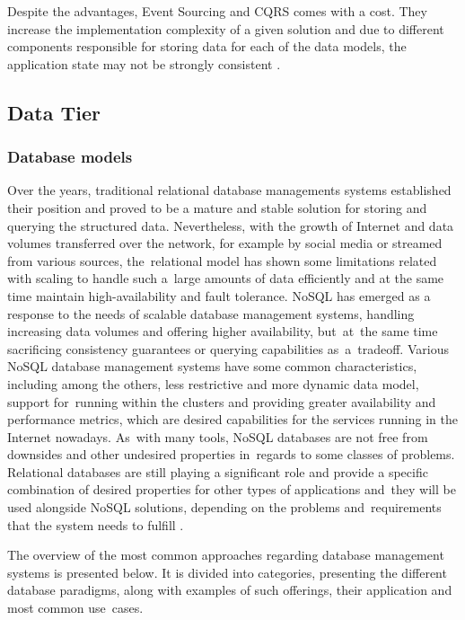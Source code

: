 Despite the advantages, Event Sourcing and CQRS comes with a cost. They increase the implementation complexity of a given solution and due to different components responsible for storing data for each of the data models, the application state may not be strongly consistent \cite{MicroservicesArchitecture}.

\subsection{Data Tier}

\subsubsection{Database models} \label{chapter:database-paradigms}

Over the years, traditional relational database managements systems \cite{RDBMS} established their position and proved to be a mature and stable solution for storing and querying the structured data. Nevertheless, with the growth of Internet and data volumes transferred over the network, for example by social media or streamed from various sources, the~relational model has shown some limitations related with scaling to handle such a~large amounts of data efficiently and at the same time maintain high-availability and fault tolerance. NoSQL \cite{FowlerNoSQLDefinition} has emerged as a response to the needs of scalable database management systems, handling increasing data volumes and offering higher availability, but~at~the same time sacrificing consistency guarantees or querying capabilities as~a~tradeoff. Various NoSQL database management systems have some common characteristics, including among the others, less restrictive and more dynamic data model, support for~running within the clusters and providing greater availability and performance metrics, which are desired capabilities for the services running in the Internet nowadays. As~with many tools, NoSQL databases are not free from downsides and other undesired properties in~regards to some classes of problems. Relational databases are still playing a significant role and provide a specific combination of desired properties for other types of applications and~they will be used alongside NoSQL solutions, depending on the problems and~requirements that the system needs to fulfill \cite{FowlerNoSQLGOTO}.

The overview of the most common approaches regarding database management systems is presented below. It is divided into categories, presenting the different database paradigms, along with examples of such offerings, their application and most common use~cases.

